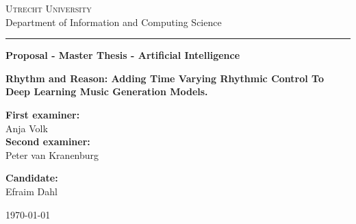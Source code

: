 
\begin{titlepage}

\begin{center}
{\scshape \Large
Utrecht University\\
}
\vspace{4mm}
{\Large
Department of Information and Computing Science
}
\vspace{8mm}
\hrule
\vspace{4mm}
\begin{spacing}{1.8}
{\large\textbf{
Proposal - Master Thesis - Artificial Intelligence
}}
\end{spacing}
\vspace{42mm}

\begin{spacing}{2.0}
{\Large \bf Rhythm and Reason: Adding Time Varying Rhythmic Control To Deep Learning Music Generation Models.}
\\
\end{spacing}
\end{center}

\vfill
\noindent
\begin{minipage}[t]{0.5\textwidth}
\large
\textbf{First examiner:
}\\
Anja Volk\\
 \vspace{5mm}
\textbf{Second examiner:}\\
Peter van Kranenburg \\
\end{minipage}
\hfill
\begin{minipage}[t]{0.5\textwidth}\raggedleft
\large
\textbf{Candidate:}\\
Efraim Dahl\\
\end{minipage}

\vspace{24mm}

\begin{center}
\large \today
\end{center}

\end{titlepage}
\restoregeometry